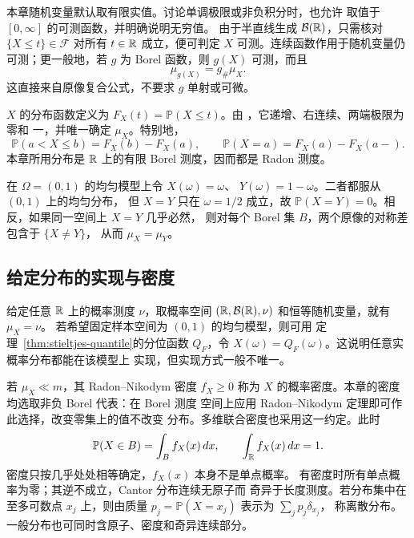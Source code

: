 本章随机变量默认取有限实值。讨论单调极限或非负积分时，也允许
取值于 \([0,\infty]\) 的可测函数，并明确说明无穷值。
由于半直线生成 \(\mathcal B(\mathbb{R})\)，只需核对
\(\{X\le t\}\in\mathcal F\) 对所有 \(t\in\mathbb{R}\) 成立，便可判定
\(X\) 可测。连续函数作用于随机变量仍可测；更一般地，若 \(g\)
为 Borel 函数，则 \(g(X)\) 可测，而且
\begin{equation}\label{eq:probability-law-composition}
 \mu_{g(X)}=g_\#\mu_X.
\end{equation}
这直接来自原像复合公式，不要求 \(g\) 单射或可微。

\(X\) 的分布函数定义为
\(F_X(t)=\mathbb P(X\le t)\)。由
，它递增、右连续、两端极限为零和
一，并唯一确定 \(\mu_X\)。特别地，
\[
 \mathbb P(a<X\le b)=F_X(b)-F_X(a),\qquad
 \mathbb P(X=a)=F_X(a)-F_X(a-).
\]
本章所用分布是 \(\mathbb{R}\) 上的有限 Borel 测度，因而都是 Radon 测度。

\begin{example}[同分布不等于同一观测量]
在 \(\Omega=(0,1)\) 的均匀模型上令 \(X(\omega)=\omega\)、
\(Y(\omega)=1-\omega\)。二者都服从 \((0,1)\) 上的均匀分布，
但 \(X=Y\) 只在 \(\omega=1/2\) 成立，故
\(\mathbb P(X=Y)=0\)。相反，如果同一空间上 \(X=Y\) 几乎必然，
则对每个 Borel 集 \(B\)，两个原像的对称差包含于 \(\{X\ne Y\}\)，
从而 \(\mu_X=\mu_Y\)。
\end{example}

\subsection{给定分布的实现与密度}

给定任意 \(\mathbb{R}\) 上的概率测度 \(\nu\)，取概率空间
\((\mathbb{R},\mathcal B(\mathbb{R}),\nu)\) 和恒等随机变量，就有 \(\mu_X=\nu\)。
若希望固定样本空间为 \((0,1)\) 的均匀模型，则可用
定理~\ref{thm:stieltjes-quantile}的分位函数 \(Q_F\)，令
\(X(\omega)=Q_F(\omega)\)。这说明任意实概率分布都能在该模型上
实现，但实现方式一般不唯一。

若 \(\mu_X\ll m\)，其 Radon--Nikodym 密度 \(f_X\ge0\) 称为
\(X\) 的概率密度。本章的密度均选取非负 Borel 代表：在 Borel 测度
空间上应用 Radon--Nikodym 定理即可作此选择，改变零集上的值不改变
分布。多维联合密度也采用这一约定。此时
\[
 \mathbb P(X\in B)=\int_Bf_X(x)\,dx,\qquad
 \int_{\mathbb{R}} f_X(x)\,dx=1.
\]
密度只按几乎处处相等确定，\(f_X(x)\) 本身不是单点概率。
有密度时所有单点概率为零；其逆不成立，Cantor 分布连续无原子而
奇异于长度测度。若分布集中在至多可数点 \(x_j\) 上，则由质量
\(p_j=\mathbb P(X=x_j)\) 表示为 \(\sum_jp_j\delta_{x_j}\)，
称离散分布。一般分布也可同时含原子、密度和奇异连续部分。

